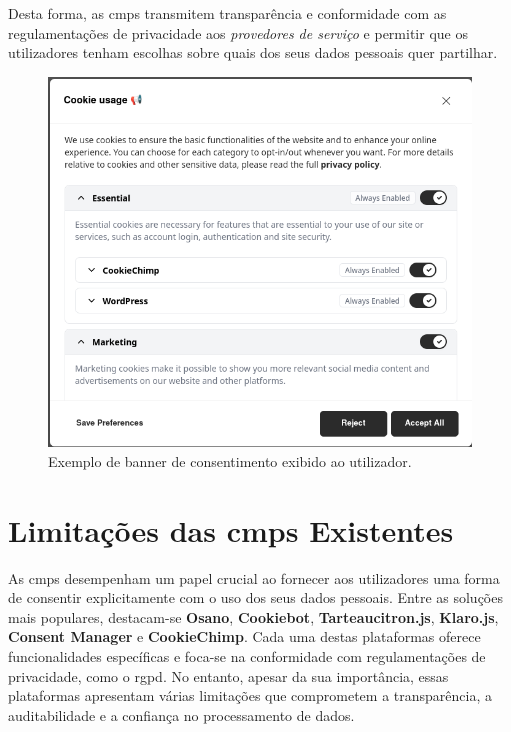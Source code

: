 Desta forma, as \acrshort{cmp}s transmitem transparência e conformidade com as regulamentações de privacidade aos \textit{provedores de serviço} e permitir que os utilizadores tenham escolhas sobre quais dos seus dados pessoais quer partilhar.

\label{fig:banner}
\begin{figure}[h]
\begin{center}
	\includegraphics[width=1.0\textwidth]{images/banner.png}
\end{center}
\caption{Exemplo de banner de consentimento exibido ao utilizador.}
\end{figure}

\newpage

\section{Limitações das \acrshort{cmp}s Existentes}

As \acrshort{cmp}s desempenham um papel crucial ao fornecer aos utilizadores uma forma de consentir explicitamente com o uso dos seus dados pessoais. Entre as soluções mais populares, destacam-se \textbf{Osano}, \textbf{Cookiebot}, \textbf{Tarteaucitron.js}, \textbf{Klaro.js}, \textbf{Consent Manager} e \textbf{CookieChimp}. Cada uma destas plataformas oferece funcionalidades específicas e foca-se na conformidade com regulamentações de privacidade, como o \acrshort{rgpd}. No entanto, apesar da sua importância, essas plataformas apresentam várias limitações que comprometem a transparência, a auditabilidade e a confiança no processamento de dados.

